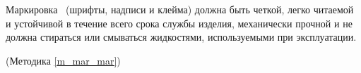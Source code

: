 Маркировка \dut \ (шрифты, надписи и клейма) должна быть четкой, легко читаемой и устойчивой в течение всего срока службы изделия, механически прочной и не должна стираться или смываться жидкостями, используемыми при эксплуатации.

\begin{flushright}
	(Методика \ref{m_mar_mar})
\end{flushright}

